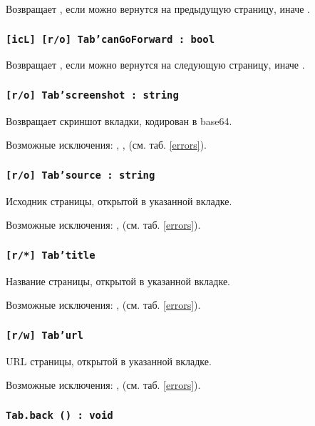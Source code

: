 Возвращает \true, если можно вернутся на предыдущую страницу, иначе \false.

\subsubsection{\texttt{[icL] [r/o] Tab'canGoForward : bool}}

Возвращает \true, если можно вернутся на следующую страницу, иначе \false.

\subsubsection{\texttt{[r/o] Tab'screenshot : string}}

Возвращает скриншот вкладки, кодирован в base64.

Возможные исключения: , ,  (см. таб. \ref{errors}).

\subsubsection{\texttt{[r/o] Tab'source : string}}

Исходник страницы, открытой в указанной вкладке.

Возможные исключения: ,  (см. таб. \ref{errors}).

\subsubsection{\texttt{[r/*] Tab'title}}

Название страницы, открытой в указанной вкладке.

Возможные исключения: ,  (см. таб. \ref{errors}).

\subsubsection{\texttt{[r/w] Tab'url}}

URL страницы, открытой в указанной вкладке.

Возможные исключения: ,  (см. таб. \ref{errors}).

\subsubsection{\texttt{Tab.back () : void}}

